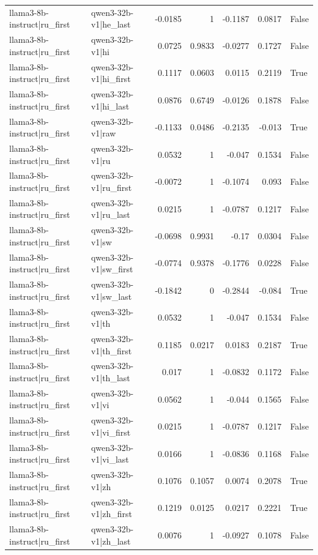 \begin{table}
\begin{tabular}{l l r r r r l}
llama3-8b-instruct|ru_first & qwen3-32b-v1|he_last & -0.0185 & 1 & -0.1187 & 0.0817 & False \\
llama3-8b-instruct|ru_first & qwen3-32b-v1|hi & 0.0725 & 0.9833 & -0.0277 & 0.1727 & False \\
llama3-8b-instruct|ru_first & qwen3-32b-v1|hi_first & 0.1117 & 0.0603 & 0.0115 & 0.2119 & True \\
llama3-8b-instruct|ru_first & qwen3-32b-v1|hi_last & 0.0876 & 0.6749 & -0.0126 & 0.1878 & False \\
llama3-8b-instruct|ru_first & qwen3-32b-v1|raw & -0.1133 & 0.0486 & -0.2135 & -0.013 & True \\
llama3-8b-instruct|ru_first & qwen3-32b-v1|ru & 0.0532 & 1 & -0.047 & 0.1534 & False \\
llama3-8b-instruct|ru_first & qwen3-32b-v1|ru_first & -0.0072 & 1 & -0.1074 & 0.093 & False \\
llama3-8b-instruct|ru_first & qwen3-32b-v1|ru_last & 0.0215 & 1 & -0.0787 & 0.1217 & False \\
llama3-8b-instruct|ru_first & qwen3-32b-v1|sw & -0.0698 & 0.9931 & -0.17 & 0.0304 & False \\
llama3-8b-instruct|ru_first & qwen3-32b-v1|sw_first & -0.0774 & 0.9378 & -0.1776 & 0.0228 & False \\
llama3-8b-instruct|ru_first & qwen3-32b-v1|sw_last & -0.1842 & 0 & -0.2844 & -0.084 & True \\
llama3-8b-instruct|ru_first & qwen3-32b-v1|th & 0.0532 & 1 & -0.047 & 0.1534 & False \\
llama3-8b-instruct|ru_first & qwen3-32b-v1|th_first & 0.1185 & 0.0217 & 0.0183 & 0.2187 & True \\
llama3-8b-instruct|ru_first & qwen3-32b-v1|th_last & 0.017 & 1 & -0.0832 & 0.1172 & False \\
llama3-8b-instruct|ru_first & qwen3-32b-v1|vi & 0.0562 & 1 & -0.044 & 0.1565 & False \\
llama3-8b-instruct|ru_first & qwen3-32b-v1|vi_first & 0.0215 & 1 & -0.0787 & 0.1217 & False \\
llama3-8b-instruct|ru_first & qwen3-32b-v1|vi_last & 0.0166 & 1 & -0.0836 & 0.1168 & False \\
llama3-8b-instruct|ru_first & qwen3-32b-v1|zh & 0.1076 & 0.1057 & 0.0074 & 0.2078 & True \\
llama3-8b-instruct|ru_first & qwen3-32b-v1|zh_first & 0.1219 & 0.0125 & 0.0217 & 0.2221 & True \\
llama3-8b-instruct|ru_first & qwen3-32b-v1|zh_last & 0.0076 & 1 & -0.0927 & 0.1078 & False \\

\end{tabular}
\end{table}
